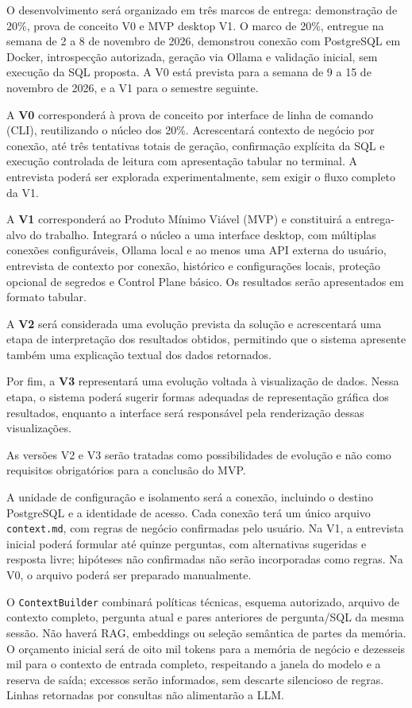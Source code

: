 O desenvolvimento será organizado em três marcos de entrega: demonstração de 20\%, prova de conceito V0 e MVP desktop V1. O marco de 20\%, entregue na semana de 2 a 8 de novembro de 2026, demonstrou conexão com PostgreSQL em Docker, introspecção autorizada, geração via Ollama e validação inicial, sem execução da SQL proposta. A V0 está prevista para a semana de 9 a 15 de novembro de 2026, e a V1 para o semestre seguinte.

A \textbf{V0} corresponderá à prova de conceito por interface de linha de comando (CLI), reutilizando o núcleo dos 20\%. Acrescentará contexto de negócio por conexão, até três tentativas totais de geração, confirmação explícita da SQL e execução controlada de leitura com apresentação tabular no terminal. A entrevista poderá ser explorada experimentalmente, sem exigir o fluxo completo da V1.

A \textbf{V1} corresponderá ao Produto Mínimo Viável (MVP) e constituirá a entrega-alvo do trabalho. Integrará o núcleo a uma interface desktop, com múltiplas conexões configuráveis, Ollama local e ao menos uma API externa do usuário, entrevista de contexto por conexão, histórico e configurações locais, proteção opcional de segredos e Control Plane básico. Os resultados serão apresentados em formato tabular.

A \textbf{V2} será considerada uma evolução prevista da solução e acrescentará uma etapa de interpretação dos resultados obtidos, permitindo que o sistema apresente também uma explicação textual dos dados retornados.

Por fim, a \textbf{V3} representará uma evolução voltada à visualização de dados. Nessa etapa, o sistema poderá sugerir formas adequadas de representação gráfica dos resultados, enquanto a interface será responsável pela renderização dessas visualizações.

As versões V2 e V3 serão tratadas como possibilidades de evolução e não como requisitos obrigatórios para a conclusão do MVP.


A unidade de configuração e isolamento será a conexão, incluindo o destino PostgreSQL e a identidade de acesso. Cada conexão terá um único arquivo \texttt{context.md}, com regras de negócio confirmadas pelo usuário. Na V1, a entrevista inicial poderá formular até quinze perguntas, com alternativas sugeridas e resposta livre; hipóteses não confirmadas não serão incorporadas como regras. Na V0, o arquivo poderá ser preparado manualmente.

O \texttt{ContextBuilder} combinará políticas técnicas, esquema autorizado, arquivo de contexto completo, pergunta atual e pares anteriores de pergunta/SQL da mesma sessão. Não haverá RAG, embeddings ou seleção semântica de partes da memória. O orçamento inicial será de oito mil tokens para a memória de negócio e dezesseis mil para o contexto de entrada completo, respeitando a janela do modelo e a reserva de saída; excessos serão informados, sem descarte silencioso de regras. Linhas retornadas por consultas não alimentarão a LLM.

